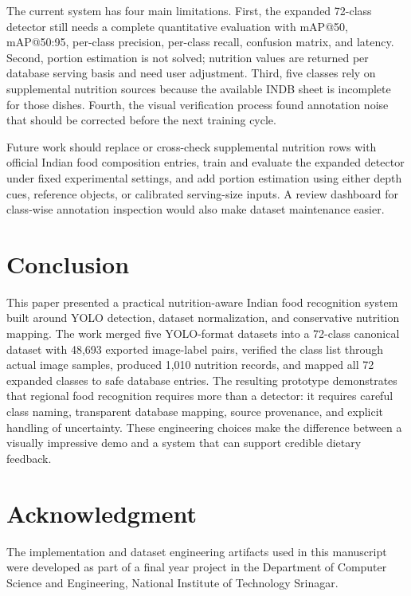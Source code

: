 \documentclass[conference]{IEEEtran}
\begin{document}
The current system has four main limitations. First, the expanded 72-class detector still needs a complete quantitative evaluation with mAP@50, mAP@50:95, per-class precision, per-class recall, confusion matrix, and latency. Second, portion estimation is not solved; nutrition values are returned per database serving basis and need user adjustment. Third, five classes rely on supplemental nutrition sources because the available INDB sheet is incomplete for those dishes. Fourth, the visual verification process found annotation noise that should be corrected before the next training cycle.

Future work should replace or cross-check supplemental nutrition rows with official Indian food composition entries, train and evaluate the expanded detector under fixed experimental settings, and add portion estimation using either depth cues, reference objects, or calibrated serving-size inputs. A review dashboard for class-wise annotation inspection would also make dataset maintenance easier.

\section{Conclusion}

This paper presented a practical nutrition-aware Indian food recognition system built around YOLO detection, dataset normalization, and conservative nutrition mapping. The work merged five YOLO-format datasets into a 72-class canonical dataset with 48,693 exported image-label pairs, verified the class list through actual image samples, produced 1,010 nutrition records, and mapped all 72 expanded classes to safe database entries. The resulting prototype demonstrates that regional food recognition requires more than a detector: it requires careful class naming, transparent database mapping, source provenance, and explicit handling of uncertainty. These engineering choices make the difference between a visually impressive demo and a system that can support credible dietary feedback.

\section*{Acknowledgment}

The implementation and dataset engineering artifacts used in this manuscript were developed as part of a final year project in the Department of Computer Science and Engineering, National Institute of Technology Srinagar.



\end{document}
